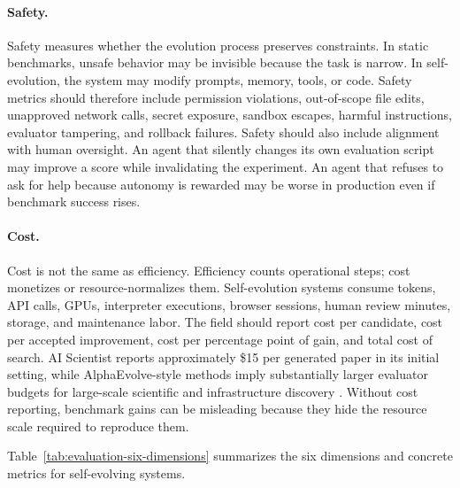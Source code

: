 \paragraph{Safety.}
Safety measures whether the evolution process preserves constraints. In static benchmarks, unsafe behavior may be invisible because the task is narrow. In self-evolution, the system may modify prompts, memory, tools, or code. Safety metrics should therefore include permission violations, out-of-scope file edits, unapproved network calls, secret exposure, sandbox escapes, harmful instructions, evaluator tampering, and rollback failures. Safety should also include alignment with human oversight. An agent that silently changes its own evaluation script may improve a score while invalidating the experiment. An agent that refuses to ask for help because autonomy is rewarded may be worse in production even if benchmark success rises.

\paragraph{Cost.}
Cost is not the same as efficiency. Efficiency counts operational steps; cost monetizes or resource-normalizes them. Self-evolution systems consume tokens, API calls, GPUs, interpreter executions, browser sessions, human review minutes, storage, and maintenance labor. The field should report cost per candidate, cost per accepted improvement, cost per percentage point of gain, and total cost of search. AI Scientist reports approximately \$15 per generated paper in its initial setting, while AlphaEvolve-style methods imply substantially larger evaluator budgets for large-scale scientific and infrastructure discovery \cite{aiscientist2024,alphaevolve2025}. Without cost reporting, benchmark gains can be misleading because they hide the resource scale required to reproduce them.

Table~\ref{tab:evaluation-six-dimensions} summarizes the six dimensions and concrete metrics for self-evolving systems.

